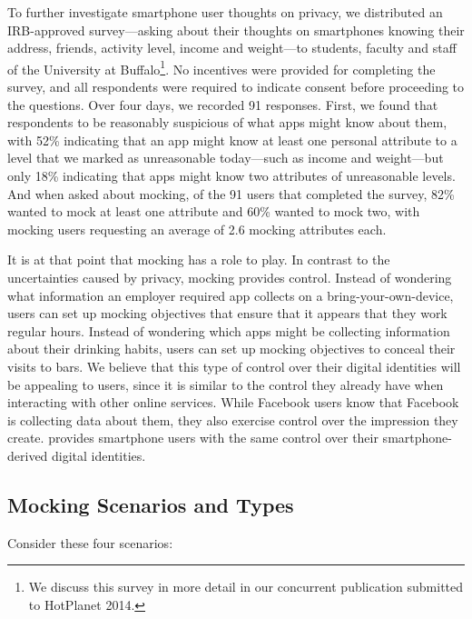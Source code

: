 To further investigate smartphone user thoughts on privacy, we distributed an
IRB-approved survey---asking about their thoughts on smartphones knowing their
address, friends, activity level, income and weight---to students, faculty and
staff of the University at Buffalo\footnote{We discuss this survey in more
detail in our concurrent publication submitted to HotPlanet 2014.}. No
incentives were provided for completing  the  survey,  and all  respondents
were  required to indicate consent before proceeding to the questions.  Over
four days, we recorded 91 responses. First,  we  found  that respondents  to be
reasonably suspicious of what apps might know about them, with 52\% indicating
that  an app  might  know  at  least  one personal attribute  to a  level  that
we marked  as  unreasonable  today---such as income and weight---but  only 18\%
indicating that  apps might know two attributes of unreasonable levels.  And
when asked about mocking,  of the 91 users that  completed  the  survey, 82\%
wanted  to mock  at least one attribute and 60\% wanted to mock two, with
mocking users requesting an average of 2.6 mocking attributes each.

It is at that point that mocking has a role to play. In contrast to the
uncertainties caused by privacy, mocking provides control. Instead of
wondering what information an employer required app collects on a
bring-your-own-device, users can set up mocking objectives that
ensure that it appears that they work regular hours. Instead of wondering
which apps might be collecting information about their drinking habits, users
can set up mocking objectives to conceal their visits to bars. We believe
that this type of control over their digital identities will be appealing
to users, since it is similar to the control they already have when
interacting with other online services. While Facebook users know that
Facebook is collecting data about them, they also exercise control over the
impression they create. \PocketMocker{} provides smartphone users with the
same control over their smartphone-derived digital identities.


\subsection{Mocking Scenarios and Types}

Consider these four scenarios:

